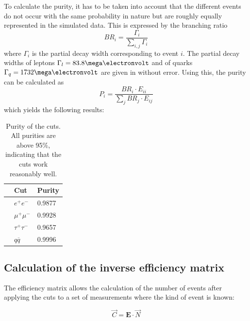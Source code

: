 To calculate the purity, it has to be taken into account that the different events do not occur with the same probability in nature but are roughly equally represented in the simulated data. This is expressed by the branching ratio
\begin{equation}
BR_i=\frac{\Gamma_i}{\sum_{i,j}\Gamma_{i}}
\end{equation}
where $\Gamma_i$ is the partial decay width corresponding to event $i$. The partial decay widths of leptons $\Gamma_l=\unit{83.8}{\mega\electronvolt}$ and of quarks $\Gamma_q=\unit{1732}{\mega\electronvolt}$ are given in \cite{staatsex} without error.
Using this, the purity can be calculated as
\begin{equation}
P_i=\frac{BR_i\cdot E_{ii}}{\sum_{j}BR_j\cdot E_{ij}}
\end{equation}
which yields the following results:

\begin{table}[H]\centering
	\begin{tabular}{@{}lll@{}}
		\toprule
		&Cut&Purity\\
		\midrule
		&$e^+e^-$&0.9877\\
		&$\mu^+\mu^-$&0.9928\\
		&$\tau^+\tau^-$&0.9657\\
		&$q\overline{q}$&0.9996\\
		\bottomrule
	\end{tabular}
	\caption[Purity of the cuts]{Purity of the cuts. All purities are above 95\%, indicating that the cuts work reasonably well.}
	\label{tb:purity}
\end{table}

\subsection{Calculation of the inverse efficiency matrix}
The efficiency matrix allows the calculation of the number of events after applying the cuts to a set of measurements where the kind of event is known:

\begin{equation}
\vec{C}=\boldsymbol{E}\cdot\vec{N}
\end{equation} 

